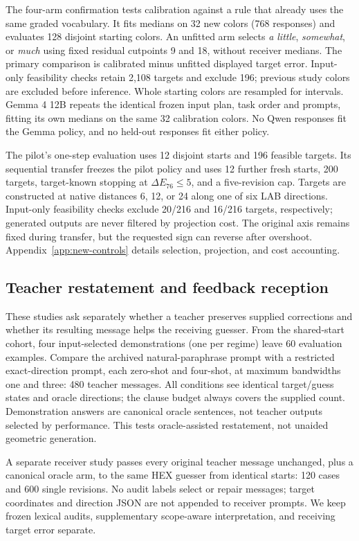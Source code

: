 \documentclass[11pt]{article}
\begin{document}
The four-arm confirmation tests calibration against a rule that already
uses the same graded vocabulary. It fits medians on 32 new colors
(768 responses) and evaluates 128 disjoint starting colors. An unfitted arm selects
\textit{a little}, \textit{somewhat}, or \textit{much} using fixed residual
cutpoints 9 and 18, without receiver medians. The primary comparison is
calibrated minus unfitted displayed target error. Input-only feasibility
checks retain 2{,}108 targets and exclude 196; previous study colors are
excluded before inference. Whole starting colors are resampled for intervals.
Gemma 4 12B repeats the identical frozen input plan, task order and prompts,
fitting its own medians on the same 32 calibration colors. No Qwen responses
fit the Gemma policy, and no held-out responses fit either policy.

The pilot's one-step evaluation uses 12 disjoint starts and 196 feasible targets.
Its sequential transfer freezes the pilot policy and uses 12 further fresh
starts, 200 targets, target-known stopping at $\Delta E_{76}\leq5$, and a
five-revision cap. Targets are constructed at native distances 6, 12, or 24
along one of six LAB directions. Input-only feasibility checks exclude
20/216 and 16/216 targets, respectively; generated outputs are never filtered
by projection cost. The original axis remains fixed during transfer, but
the requested sign can reverse after overshoot. Appendix~\ref{app:new-controls}
details selection, projection, and cost accounting.

\subsection{Teacher restatement and feedback reception}
\label{sec:setup_teacher}
These studies ask separately whether a teacher preserves supplied
corrections and whether its resulting message helps the receiving guesser.
From the shared-start cohort, four input-selected demonstrations (one per
regime) leave 60 evaluation examples. Compare the archived natural-paraphrase
prompt with a restricted exact-direction prompt, each zero-shot and four-shot,
at maximum bandwidths one and three: 480 teacher messages.
All conditions see identical target/guess states and oracle directions;
the clause budget always covers the supplied count. Demonstration answers
are canonical oracle sentences, not teacher outputs selected by performance.
This tests oracle-assisted restatement, not unaided geometric generation.

A separate receiver study passes every original teacher message unchanged,
plus a canonical oracle arm, to the same HEX guesser from identical starts:
120 cases and 600 single revisions. No audit labels select or repair messages;
target coordinates and direction JSON are not appended to receiver prompts.
We keep frozen lexical audits, supplementary scope-aware interpretation,
and receiving target error separate.
\end{document}
